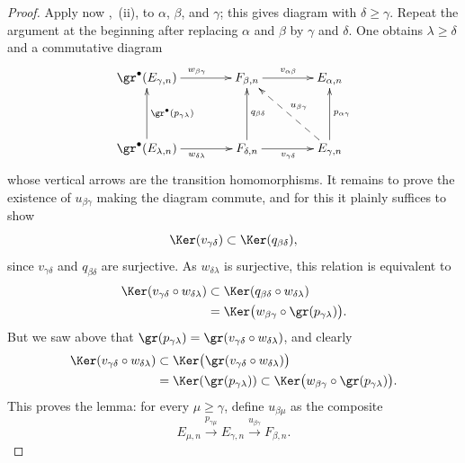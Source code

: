 \begin{proof}
Apply now ,~(ii), to $\alpha$, $\beta$, and $\gamma$;
this gives diagram  with $\delta\geq\gamma$.
Repeat the argument at the beginning after replacing $\alpha$ and $\beta$ by $\gamma$ and $\delta$.
One obtains $\lambda\geq\delta$ and a commutative diagram
\[
\xymatrix@C=4em@R=4em{
  \gr^\bullet(E_{\gamma,n})\ar[r]^{w_{\beta\gamma}} &
  F_{\beta,n}\ar[r]^{v_{\alpha\beta}} & E_{\alpha,n} \\
  \gr^\bullet(E_{\lambda,n})\ar[u]_{\gr^\bullet(p_{\gamma\lambda})}
    \ar[r]_{w_{\delta\lambda}} &
  F_{\delta,n}\ar[u]_{q_{\beta\delta}}\ar[r]_{v_{\gamma\delta}} &
  E_{\gamma,n}\ar[u]_{p_{\alpha\gamma}}
    \ar@{-->}[ul]_{u_{\beta\gamma}}
}
\]
whose vertical arrows are the transition homomorphisms.
It remains to prove the existence of $u_{\beta\gamma}$ making the diagram commute, and for this it plainly suffices to show
\[
  \Ker(v_{\gamma\delta})\subset\Ker(q_{\beta\delta}),
\]
since $v_{\gamma\delta}$ and $q_{\beta\delta}$ are surjective.
As $w_{\delta\lambda}$ is surjective, this relation is equivalent to
\[
\begin{split}
  \Ker(v_{\gamma\delta}\circ w_{\delta\lambda})
  &\subset\Ker(q_{\beta\delta}\circ w_{\delta\lambda})\\
  &=\Ker\bigl(w_{\beta\gamma}\circ\gr(p_{\gamma\lambda})\bigr).
\end{split}
\]
But we saw above that
$\gr(p_{\gamma\lambda})=\gr(v_{\gamma\delta}\circ w_{\delta\lambda})$, and clearly
\[
\begin{split}
  \Ker(v_{\gamma\delta}\circ w_{\delta\lambda})
  &\subset\Ker\bigl(\gr(v_{\gamma\delta}\circ w_{\delta\lambda})\bigr)\\
  &=\Ker(\gr(p_{\gamma\lambda}))
  \subset\Ker\bigl(w_{\beta\gamma}\circ\gr(p_{\gamma\lambda})\bigr).
\end{split}
\]
This proves the lemma: for every $\mu\geq\gamma$, define $u_{\beta\mu}$ as the composite
\[
  E_{\mu,n}\xrightarrow{p_{\gamma\mu}}E_{\gamma,n}
  \xrightarrow{u_{\beta\gamma}}F_{\beta,n}.
\]
\end{proof}

